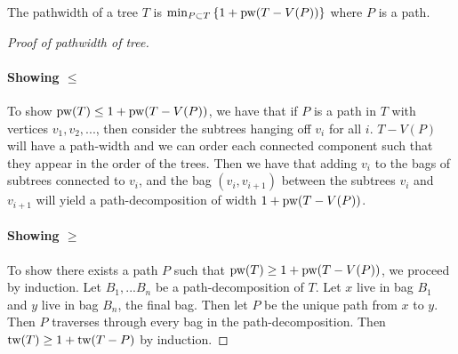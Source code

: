 \begin{theorem}
	The pathwidth of a tree $T$ is $\min_{P \subset T} \left\lbrace 1 + \text{pw}(T - V(P))\right\rbrace $ where $P$ is a path.
\end{theorem}

\begin{proof}[Proof of pathwidth of tree]
	\item
	\paragraph{Showing $\leq$}
	To show $\text{pw}(T) \leq 1 + \text{pw}(T - V(P))$, we have that if $P$ is a path in $T$ with vertices $v_1, v_2, ...$, then consider the subtrees hanging off $v_i$ for all $i$. $T - V(P)$ will have a path-width and we can order each connected component such that they appear in the order of the trees. Then we have that adding $v_i$ to the bags of subtrees connected to $v_i$, and the bag $(v_i, v_{i+1})$ between the subtrees $v_i$ and $v_{i + 1}$ will yield a path-decomposition of width $1 + \text{pw}(T - V(P))$. 
	\item
	\paragraph{Showing $\geq$}
	To show there exists a path $P$ such that $\text{pw}(T) \geq 1 + \text{pw}(T - V(P))$, we proceed by induction. Let $B_1, ... B_n$ be a path-decomposition of $T$. Let $x$ live in bag $B_1$ and $y$ live in bag $B_n$, the final bag. Then let $P$ be the unique path from $x$ to $y$. Then $P$ traverses through every bag in the path-decomposition. Then $\text{tw}(T) \geq 1 + \text{tw}(T - P)$ by induction. 
\end{proof}